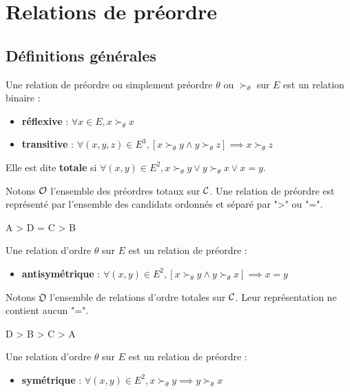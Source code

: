 
\section{Relations de préordre}

\subsection{Définitions générales}

\begin{definition}
	Une relation de préordre ou simplement préordre $\theta$ ou $\succ_\theta$ sur $E$ est un relation binaire :
	\begin{itemize}
		\item \textbf{réflexive} : $\forall x \in E, x \succ_\theta x$
		\item \textbf{transitive} : $\forall (x, y, z) \in E^3, [x \succ_\theta y \wedge y \succ_\theta z] \implies x \succ_\theta z$
	\end{itemize}
	Elle est dite \textbf{totale} si $\forall (x, y) \in E^2, x \succ_\theta y \vee y \succ_\theta x \vee x = y$.
\end{definition}

Notons $\mathcal{O}$ l'ensemble des préordres totaux sur $\mathcal{C}$.
Une relation de préordre est représenté par l'ensemble des candidats ordonnés et séparé par ">" ou "=".

\begin{exemple}
	A > D = C > B
\end{exemple}

\begin{definition}
	Une relation d'ordre $\theta$ sur $E$ est un relation de préordre :
	\begin{itemize}
		\item \textbf{antisymétrique} : $\forall (x, y) \in E^2, [x \succ_\theta y \wedge y \succ_\theta x] \implies x = y$
	\end{itemize}
\end{definition}


Notons $\mathfrak{O}$ l'ensemble de relations d'ordre totales sur $\mathcal{C}$. Leur représentation ne contient aucun "=".

\begin{exemple}
	 D > B > C > A
\end{exemple}

\begin{definition}
	Une relation d'ordre $\theta$ sur $E$ est un relation de préordre :
	\begin{itemize}
		\item \textbf{symétrique} : $\forall (x, y) \in E^2, x \succ_\theta y \implies y \succ_\theta x$
	\end{itemize}
\end{definition}


